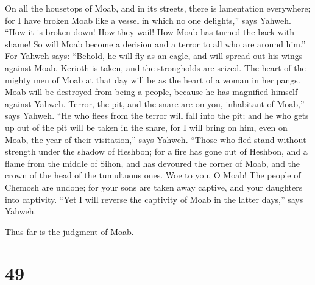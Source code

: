  On all the housetops of Moab, and in its streets, there
is lamentation everywhere; for I have broken Moab like a vessel in which
no one delights,'' says Yahweh.  ``How it is broken down!
How they wail! How Moab has turned the back with shame! So will Moab
become a derision and a terror to all who are around him.''
 For Yahweh says: ``Behold, he will fly as an eagle, and
will spread out his wings against Moab.  Kerioth is
taken, and the strongholds are seized. The heart of the mighty men of
Moab at that day will be as the heart of a woman in her pangs.
 Moab will be destroyed from being a people, because he
has magnified himself against Yahweh.  Terror, the pit,
and the snare are on you, inhabitant of Moab,'' says Yahweh.
 ``He who flees from the terror will fall into the pit;
and he who gets up out of the pit will be taken in the snare, for I will
bring on him, even on Moab, the year of their visitation,'' says Yahweh.
 ``Those who fled stand without strength under the shadow
of Heshbon; for a fire has gone out of Heshbon, and a flame from the
middle of Sihon, and has devoured the corner of Moab, and the crown of
the head of the tumultuous ones.  Woe to you, O Moab! The
people of Chemosh are undone; for your sons are taken away captive, and
your daughters into captivity.  ``Yet I will reverse the
captivity of Moab in the latter days,'' says Yahweh.

Thus far is the judgment of Moab.

\hypertarget{section-48}{%
\section{49}\label{section-48}}

